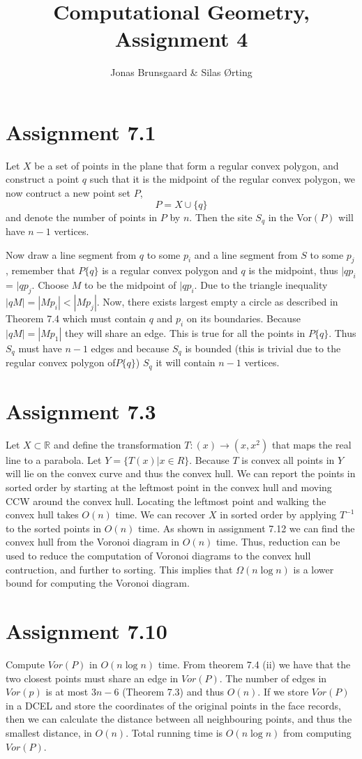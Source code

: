 \documentclass[10pt,a4paper,final,oneside,openany,article,oldfontcommands]{memoir}
\title{Computational Geometry, Assignment 4}
\author{
    Jonas Brunsgaard \& Silas Ørting
}
\begin{document}
\maketitle


\chapter*{Assignment 7.1}
Let $X$ be a set of points in the plane that form a regular convex polygon,
and construct a point $q$ such that it is the midpoint of the regular convex
polygon, we now contruct a new point set $P$, $$ P=X \cup \{q\} $$ and denote
the number of points in $P$ by $n$.
Then the site $S_q$ in the Vor$(P)$ will have $n-1$ vertices.

Now draw a line segment from $q$ to some $p_i$ and a line segment from $S$ to
some $p_j$, remember that $P\{q\}$ is a regular convex polygon and $q$ is the
midpoint, thus $|qp_i$ = $|qp_j$. Choose $M$ to be the midpoint of $|qp_i$.
Due to the triangle inequality $|qM| = |Mp_i| < |Mp_j|$. Now, there exists
largest empty a circle as described in Theorem 7.4 which must contain $q$ and
$p_i$ on its boundaries. Because $|qM|=|Mp_1|$ they will share an edge. This
is true for all the points in $P\{q\}$. Thus $S_q$ must have $n-1$ edges and
because $S_q$ is bounded (this is trivial due to the regular convex polygon
of$P\{q\}$) $S_q$ it will contain $n-1$ vertices.


\chapter*{Assignment 7.3}
Let $X \subset \mathbb{R}$ and define the transformation $T : (x) \to (x,
x^2)$ that maps the real line to a parabola. Let $Y = \{T(x) | x \in R\}$.
Because $T$ is convex all points in $Y$ will lie on the convex curve and thus
the convex hull. We can report the points in sorted order by starting at the
leftmost point in the convex hull and moving CCW around the convex hull.
Locating the leftmost point and walking the convex hull takes $O(n)$ time.
We can recover $X$ in sorted order by applying $T^{-1}$ to the sorted points
in $O(n)$ time. As shown in assignment 7.12 we can find the convex hull from
the Voronoi diagram in $O(n)$ time. Thus, reduction can be used to reduce the
computation of Voronoi diagrams to the convex hull contruction, and further to
sorting. This implies that $\Omega(n \log n)$ is a lower bound for computing
the Voronoi diagram.

\chapter*{Assignment 7.10}
Compute $Vor(P)$ in $O(n \log n)$ time. From theorem 7.4 (ii) we have that
the two closest points must share an edge in $Vor(P)$. The number of edges in
$Vor(p)$ is at most $3n-6$ (Theorem 7.3) and thus $O(n)$. If we store
$Vor(P)$ in a DCEL and store the coordinates of the original points in the
face records, then we can calculate the distance between all neighbouring
points, and thus the smallest distance, in $O(n)$. Total running time is $O(n
\log n)$ from computing $Vor(P)$.
\end{document}
